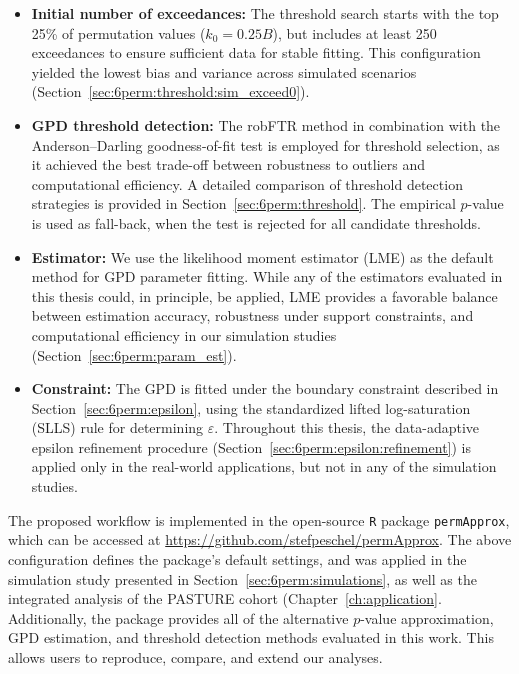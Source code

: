 \begin{itemize}

    \item \textbf{Initial number of exceedances:} The threshold search starts with the top 25\% of permutation values ($k_0 = 0.25B$), but includes at least 250 exceedances to ensure sufficient data for stable fitting. This configuration yielded the lowest bias and variance across simulated scenarios (Section~\ref{sec:6perm:threshold:sim_exceed0}).

    \item \textbf{GPD threshold detection:} The robFTR method in combination with the Anderson--Darling goodness-of-fit test is employed for threshold selection, as it achieved the best trade-off between robustness to outliers and computational efficiency. A detailed comparison of threshold detection strategies is provided in Section~\ref{sec:6perm:threshold}. The empirical $p$-value is used as fall-back, when the test is rejected for all candidate thresholds. 
      
    \item \textbf{Estimator:} We use the likelihood moment estimator (LME) as the default method for GPD parameter fitting. While any of the estimators evaluated in this thesis could, in principle, be applied, LME provides a favorable balance between estimation accuracy, robustness under support constraints, and computational efficiency in our simulation studies (Section~\ref{sec:6perm:param_est}).
    
    \item \textbf{Constraint:} The GPD is fitted under the boundary constraint described in Section~\ref{sec:6perm:epsilon}, using the standardized lifted log-saturation (SLLS) rule for determining $\varepsilon$. Throughout this thesis, the data-adaptive epsilon refinement procedure (Section~\ref{sec:6perm:epsilon:refinement}) is applied only in the real-world applications, but not in any of the simulation studies.

\end{itemize}

The proposed workflow is implemented in the open-source \texttt{R} package \texttt{permApprox}, which can be accessed at \url{https://github.com/stefpeschel/permApprox}.
The above configuration defines the package’s default settings, and was applied in the simulation study presented in Section~\ref{sec:6perm:simulations}, as well as the integrated analysis of the PASTURE cohort (Chapter~\ref{ch:application}. 
Additionally, the package provides all of the alternative $p$-value approximation, GPD estimation, and threshold detection methods evaluated in this work. This allows users to reproduce, compare, and extend our analyses.

